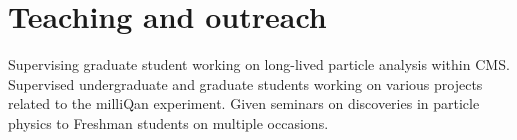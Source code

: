 \section{Teaching and outreach}
 {Supervising graduate student working on long-lived particle analysis within CMS.} 
 {Supervised undergraduate and graduate students working on various projects related to the milliQan experiment.} 
 {Given seminars on discoveries in particle physics to Freshman students on multiple occasions.} 

